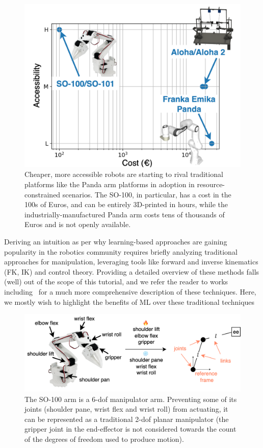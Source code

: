 \begin{figure}
    \centering
    \includegraphics[width=0.4\linewidth]{figures/ch2/ch2-cost-accessibility.pdf}
    \caption{Cheaper, more accessible robots are starting to rival traditional platforms like the Panda arm platforms in adoption in resource-constrained scenarios. The SO-100, in particular, has a cost in the 100s of Euros, and can be entirely 3D-printed in hours, while the industrially-manufactured Panda arm costs tens of thousands of Euros and is not openly available.}
    \label{fig:robotic-platforms-costs}
\end{figure}

Deriving an intuition as per why learning-based approaches are gaining popularity in the robotics community requires briefly analyzing traditional approaches for manipulation, leveraging tools like forward and inverse kinematics (FK, IK) and control theory.
Providing a detailed overview of these methods falls (well) out of the scope of this tutorial, and we refer the reader to works including~\citet{sicilianoSpringerHandbookRobotics2016, lynchModernRoboticsMechanics2017, tedrakeRoboticManipulationPerception, tedrakeUnderactuatedRoboticsAlgorithms} for a much more comprehensive description of these techniques.
Here, we mostly wish to highlight the benefits of ML over these traditional techniques

\begin{figure}
    \centering
    \includegraphics[width=0.7\linewidth]{figures/ch2/ch2-so100-to-planar-manipulator.pdf}
    \caption{The SO-100 arm is a 6-dof manipulator arm. Preventing some of its joints (shoulder pane, wrist flex and wrist roll) from actuating, it can be represented as a traditional 2-dof planar manipulator (the gripper joint in the end-effector is not considered towards the count of the degrees of freedom used to produce motion).}
    \label{fig:make-so100-planar-manipulator}
\end{figure}


